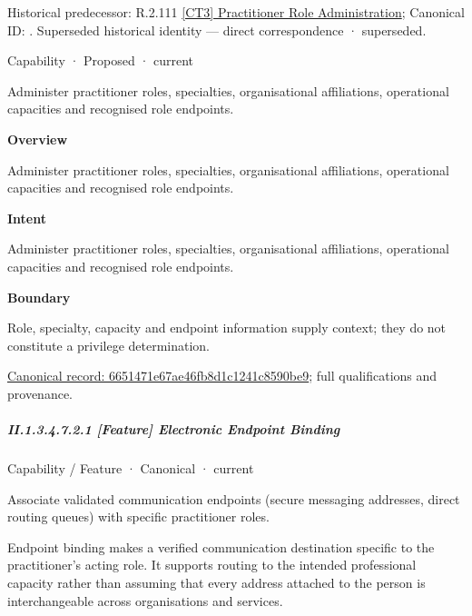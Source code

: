 {\small Historical predecessor: R.2.111 \hyperref[element:6b777f1201db474eb22dd89f2b1f68c6]{[CT3] Practitioner Role Administration}; Canonical ID: \texttt{}. Superseded historical identity — direct correspondence · superseded.}\par
\label{element:6651471e67ae46fb8d1c1241c8590be9}
{\small Capability · Proposed · current}\par

Administer practitioner roles, specialties, organisational affiliations, operational capacities and recognised role endpoints.



\textbf{Overview}



Administer practitioner roles, specialties, organisational affiliations, operational capacities and recognised role endpoints.



\textbf{Intent}



Administer practitioner roles, specialties, organisational affiliations, operational capacities and recognised role endpoints.



\textbf{Boundary}



Role, specialty, capacity and endpoint information supply context; they do not constitute a privilege determination.


{\footnotesize \href{../../../../continuum/strategy/capability/6651471e67ae46fb8d1c1241c8590be9.md}{Canonical record: 6651471e67ae46fb8d1c1241c8590be9}; full qualifications and provenance.}\par
\subparagraph*{II.1.3.4.7.2.1 [Feature] Electronic Endpoint Binding}
\label{navigation:II.1.3.4.7.2.1}

\label{element:5dc3a424e68d47aea64ec573dc4b1225}
{\small Capability / Feature · Canonical · current}\par

Associate validated communication endpoints (secure messaging addresses, direct routing queues) with specific practitioner roles.



Endpoint binding makes a verified communication destination specific to the practitioner's acting role. It supports routing to the intended professional capacity rather than assuming that every address attached to the person is interchangeable across organisations and services.


